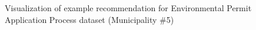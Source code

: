 \begin{itemize}
\begin{itemize}
\begin{figure}
			\caption{Visualization of example recommendation for Environmental Permit Application Process dataset (Municipality \#5)}
		  \label{fig:coselog-wabo-recommendation-visualization-mun-5}
		\end{figure}
	\end{itemize} %

\end{itemize} %